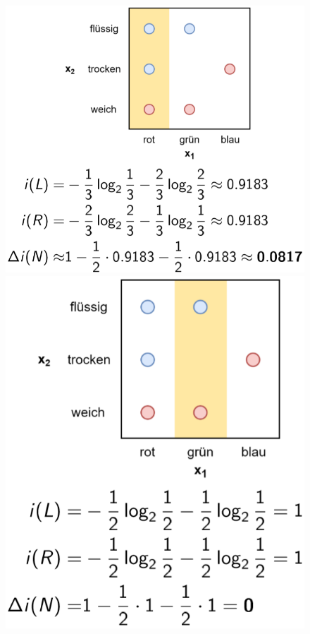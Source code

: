 \documentclass{report}
\begin{document}
\begin{figure}[H]
  \centering
  \begin{minipage}[b]{0.4\textwidth}
    \includegraphics[scale=.235]{ml07_8}
  \end{minipage}
  \begin{minipage}[b]{0.4\textwidth}
    \includegraphics[scale=.235]{ml07_9}
  \end{minipage}
\end{figure}
\end{document}
